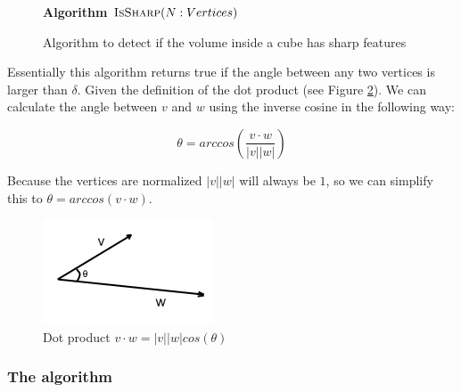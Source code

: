 \documentclass[a4wide,10pt,twocolumn]{article}
\begin{document}
    \begin{figure}[ht]
            \textbf{Algorithm} $\textsc{IsSharp}(N: Vertices)$\\
            \noindent
            \begin{algorithm}[H]
                \;
                \BlankLine
                \;
            \end{algorithm}
        \caption{Algorithm to detect if the volume inside a cube has sharp features}
        \label{figure:algorithm}
    \end{figure}

Essentially this algorithm returns true if the angle between any two vertices is larger than $\delta$. Given the definition of the dot product (see Figure \ref{figure:dot_product}). We can calculate the angle between $v$ and $w$ using the inverse cosine in the following way:

\begin{equation}
    \theta = arccos(\displaystyle\frac{v \cdot w}{|v||w|})
\end{equation}

Because the vertices are normalized $|v||w|$ will always be $1$, so we can simplify this to $\theta = arccos(v \cdot w)$.

    \begin{figure}[h!]
        \begin{center}
            \includegraphics[scale=0.8]{./images/dotproduct}
        \end{center}
        \caption{Dot product $v \cdot w = |v||w|cos(\theta)$}
        \label{figure:dot_product}
    \end{figure}


\subsubsection{The algorithm}
\end{document}
